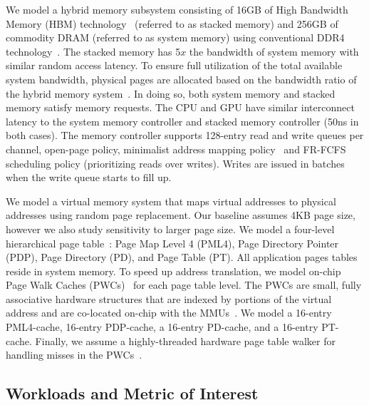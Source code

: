 
We model a hybrid memory subsystem consisting of 16GB of High
Bandwidth Memory (HBM) technology~\cite{hbm-spec} (referred to as
stacked memory) and 256GB of commodity DRAM (referred to as system
memory) using conventional DDR4 technology~\cite{ddr4-spec}. The
stacked memory has 5$x$ the bandwidth of system memory with similar
random access latency. To ensure full utilization of the total
available system bandwidth, physical pages are allocated based on the
bandwidth ratio of the hybrid memory system~\cite{bwa,batman}. In
doing so, both system memory and stacked memory satisfy memory
requests. The CPU and GPU have similar interconnect latency to the
system memory controller and stacked memory controller (50ns in both
cases). The memory controller supports 128-entry read and write queues
per channel, open-page policy, minimalist address mapping
policy~\cite{minimalist} and FR-FCFS scheduling policy (prioritizing
reads over writes). Writes are issued in batches when the write queue
starts to fill up.


We model a virtual memory system that maps virtual addresses to
physical addresses using random page replacement. Our baseline assumes
4KB page size, however we also study sensitivity to larger page size.
We model a four-level hierarchical page table~\cite{SkipPT}: Page Map
Level 4 (PML4), Page Directory Pointer (PDP), Page Directory (PD), and
Page Table (PT). All application pages tables reside in system memory.
To speed up address translation, we model on-chip Page Walk Caches
(PWCs)~\cite{SkipPT, MMUcaches} for each page table level. The PWCs
are small, fully associative hardware structures that are indexed by
portions of the virtual address and are co-located on-chip with the
MMUs~\cite{MMUcaches}. We model a 16-entry PML4-cache, 16-entry
PDP-cache, a 16-entry PD-cache, and a 16-entry
PT-cache\cite{MMUcaches}. Finally, we assume a highly-threaded
hardware page table walker for handling misses in the
PWCs~\cite{power2014supporting, pichaigpu}.

\subsection{Workloads and Metric of Interest}

